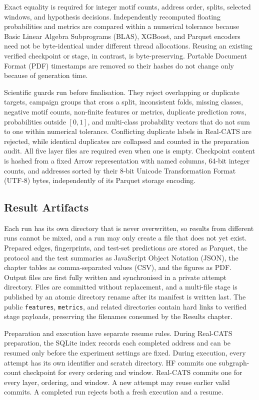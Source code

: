 \documentclass{thesisclass}
\begin{document}
Exact equality is required for integer motif counts, address order, splits,
selected windows, and hypothesis decisions. Independently recomputed floating
probabilities and metrics are compared within a numerical tolerance because
Basic Linear Algebra Subprograms (BLAS), XGBoost, and Parquet encoders need not be byte-identical under different
thread allocations. Reusing an existing verified checkpoint or stage, in
contrast, is byte-preserving. Portable Document Format (PDF) timestamps are
removed so their hashes do not
change only because of generation time.

Scientific guards run before finalisation. They reject overlapping or duplicate
targets, campaign groups that cross a split, inconsistent folds, missing
classes, negative motif counts, non-finite features or metrics, duplicate
prediction rows, probabilities outside $[0,1]$, and multi-class probability
vectors that do not sum to one within numerical tolerance. Conflicting
duplicate labels in Real-CATS are rejected, while identical duplicates are
collapsed and counted in the preparation audit. All five layer files are
required even when one is empty. Checkpoint content is hashed from a fixed
Arrow representation with named columns, 64-bit integer counts, and addresses
sorted by their 8-bit Unicode Transformation Format (UTF-8) bytes,
independently of its Parquet storage encoding.

\subsection{Result Artifacts}

Each run has its own directory that is never overwritten, so results from
different runs cannot be mixed, and a run may only create a file that does not yet
exist. Prepared edges, fingerprints, and test-set predictions are stored as
Parquet, the protocol and the test summaries as JavaScript Object Notation
(JSON), the chapter tables as comma-separated values (CSV),
and the figures as PDF. Output files are first fully written and synchronised in
a private attempt directory. Files are committed without replacement, and a
multi-file stage is published by an atomic directory rename after its manifest is
written last. The public \texttt{features}, \texttt{metrics}, and related
directories contain hard links to verified stage payloads, preserving the
filenames consumed by the Results chapter.

Preparation and execution have separate resume rules. During Real-CATS
preparation, the SQLite index records each completed address and can be resumed
only before the experiment settings are fixed. During execution, every attempt
has its own identifier and scratch directory. HF commits one subgraph-count
checkpoint for every ordering and window. Real-CATS commits one for every layer, ordering, and
window. A new attempt may reuse earlier valid commits. A completed run rejects
both a fresh execution and a resume.
\end{document}
